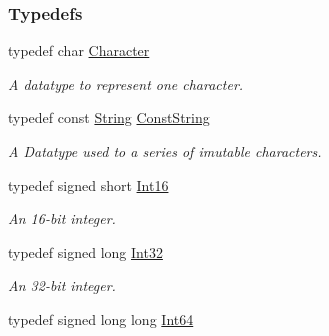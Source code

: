 \subsubsection*{Typedefs}
\begin{DoxyCompactItemize}
\item 
typedef char \hyperlink{namespaceMezzanine_ad5147a419db7627ee552a2b582f1052d}{Character}
\begin{DoxyCompactList}\small\item\em A datatype to represent one character. \item\end{DoxyCompactList}\item 
typedef const \hyperlink{namespaceMezzanine_acf9fcc130e6ebf08e3d8491aebcf1c86}{String} \hyperlink{namespaceMezzanine_a63cd699ac54b73953f35ec9cfc05e506}{ConstString}
\begin{DoxyCompactList}\small\item\em A Datatype used to a series of imutable characters. \item\end{DoxyCompactList}\item 
\hypertarget{namespaceMezzanine_adb602bffcbc8f1b381b2f529e9e364f6}{
typedef signed short \hyperlink{namespaceMezzanine_adb602bffcbc8f1b381b2f529e9e364f6}{Int16}}
\label{namespaceMezzanine_adb602bffcbc8f1b381b2f529e9e364f6}

\begin{DoxyCompactList}\small\item\em An 16-\/bit integer. \item\end{DoxyCompactList}\item 
\hypertarget{namespaceMezzanine_a590a2f3eb4a187e1b25209e546e540e1}{
typedef signed long \hyperlink{namespaceMezzanine_a590a2f3eb4a187e1b25209e546e540e1}{Int32}}
\label{namespaceMezzanine_a590a2f3eb4a187e1b25209e546e540e1}

\begin{DoxyCompactList}\small\item\em An 32-\/bit integer. \item\end{DoxyCompactList}\item 
\hypertarget{namespaceMezzanine_ab203dfc8311caab7cc86ee5a0bf962ed}{
typedef signed long long \hyperlink{namespaceMezzanine_ab203dfc8311caab7cc86ee5a0bf962ed}{Int64}}
\label{namespaceMezzanine_ab203dfc8311caab7cc86ee5a0bf962ed}


\end{DoxyCompactItemize}
